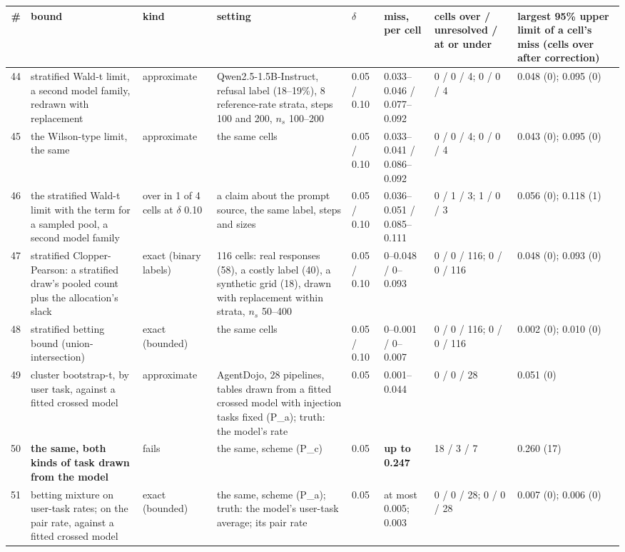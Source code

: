 \begin{tabular}{@{}r p{2.8cm} p{2.0cm} p{3.9cm} l p{2.1cm} p{2.0cm} p{1.9cm}@{}}
\toprule
\textbf{\#} & \textbf{bound} & \textbf{kind} & \textbf{setting} & \textbf{$\delta$} & \textbf{miss, per cell} & \textbf{cells over / unresolved / at or under} & \textbf{largest 95\% upper limit of a cell's miss (cells over after correction)} \\
\midrule
44 & stratified Wald-t limit, a second model family, redrawn with replacement & approximate & Qwen2.5-1.5B-Instruct, refusal label (18--19\%), 8 reference-rate strata, steps 100 and 200, $n_s$ 100--200 & 0.05 / 0.10 & 0.033--0.046 / 0.077--0.092 & 0 / 0 / 4; 0 / 0 / 4 & 0.048 (0); 0.095 (0) \\
45 & the Wilson-type limit, the same & approximate & the same cells & 0.05 / 0.10 & 0.033--0.041 / 0.086--0.092 & 0 / 0 / 4; 0 / 0 / 4 & 0.043 (0); 0.095 (0) \\
46 & the stratified Wald-t limit with the term for a sampled pool, a second model family & over in 1 of 4 cells at $\delta$ 0.10 & a claim about the prompt source, the same label, steps and sizes & 0.05 / 0.10 & 0.036--0.051 / 0.085--0.111 & 0 / 1 / 3; 1 / 0 / 3 & 0.056 (0); 0.118 (1) \\
47 & stratified Clopper-Pearson: a stratified draw's pooled count plus the allocation's slack & exact (binary labels) & 116 cells: real responses (58), a costly label (40), a synthetic grid (18), drawn with replacement within strata, $n_s$ 50--400 & 0.05 / 0.10 & 0--0.048 / 0--0.093 & 0 / 0 / 116; 0 / 0 / 116 & 0.048 (0); 0.093 (0) \\
48 & stratified betting bound (union-intersection) & exact (bounded) & the same cells & 0.05 / 0.10 & 0--0.001 / 0--0.007 & 0 / 0 / 116; 0 / 0 / 116 & 0.002 (0); 0.010 (0) \\
49 & cluster bootstrap-t, by user task, against a fitted crossed model & approximate & AgentDojo, 28 pipelines, tables drawn from a fitted crossed model with injection tasks fixed (P\_a); truth: the model's rate & 0.05 & 0.001--0.044 & 0 / 0 / 28 & 0.051 (0) \\
50 & \textbf{the same, both kinds of task drawn from the model} & fails & the same, scheme (P\_c) & 0.05 & \textbf{up to 0.247} & 18 / 3 / 7 & 0.260 (17) \\
51 & betting mixture on user-task rates; on the pair rate, against a fitted crossed model & exact (bounded) & the same, scheme (P\_a); truth: the model's user-task average; its pair rate & 0.05 & at most 0.005; 0.003 & 0 / 0 / 28; 0 / 0 / 28 & 0.007 (0); 0.006 (0) \\

\end{tabular}
